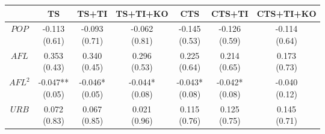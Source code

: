\begin{tabular}{ccccccc}
\toprule
                                               &                                   TS &                                TS+TI &                             TS+TI+KO &                                  CTS &                               CTS+TI &                            CTS+TI+KO \\
\midrule
                                         $POP$ &            \makecell{-0.113\\(0.61)} &            \makecell{-0.093\\(0.71)} &            \makecell{-0.062\\(0.81)} &            \makecell{-0.145\\(0.53)} &            \makecell{-0.126\\(0.59)} &            \makecell{-0.114\\(0.64)} \\
                                         $AFL$ &             \makecell{0.353\\(0.43)} &             \makecell{0.340\\(0.45)} &             \makecell{0.296\\(0.53)} &             \makecell{0.225\\(0.64)} &             \makecell{0.214\\(0.65)} &             \makecell{0.173\\(0.73)} \\
                                       $AFL^2$ &          \makecell{-0.047**\\(0.05)} &           \makecell{-0.046*\\(0.05)} &           \makecell{-0.044*\\(0.08)} &           \makecell{-0.043*\\(0.08)} &           \makecell{-0.042*\\(0.08)} &            \makecell{-0.040\\(0.12)} \\
                                         $URB$ &             \makecell{0.072\\(0.83)} &             \makecell{0.067\\(0.85)} &             \makecell{0.021\\(0.96)} &             \makecell{0.115\\(0.76)} &             \makecell{0.125\\(0.75)} &             \makecell{0.145\\(0.71)} \\

\end{tabular}
